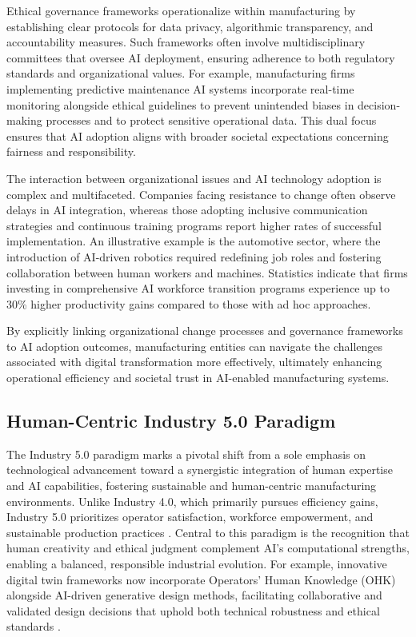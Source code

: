 \documentclass[sigconf]{acmart}
\begin{document}
Ethical governance frameworks operationalize within manufacturing by establishing clear protocols for data privacy, algorithmic transparency, and accountability measures. Such frameworks often involve multidisciplinary committees that oversee AI deployment, ensuring adherence to both regulatory standards and organizational values. For example, manufacturing firms implementing predictive maintenance AI systems incorporate real-time monitoring alongside ethical guidelines to prevent unintended biases in decision-making processes and to protect sensitive operational data. This dual focus ensures that AI adoption aligns with broader societal expectations concerning fairness and responsibility.

The interaction between organizational issues and AI technology adoption is complex and multifaceted. Companies facing resistance to change often observe delays in AI integration, whereas those adopting inclusive communication strategies and continuous training programs report higher rates of successful implementation. An illustrative example is the automotive sector, where the introduction of AI-driven robotics required redefining job roles and fostering collaboration between human workers and machines. Statistics indicate that firms investing in comprehensive AI workforce transition programs experience up to 30\% higher productivity gains compared to those with ad hoc approaches.

By explicitly linking organizational change processes and governance frameworks to AI adoption outcomes, manufacturing entities can navigate the challenges associated with digital transformation more effectively, ultimately enhancing operational efficiency and societal trust in AI-enabled manufacturing systems.

\subsection{Human-Centric Industry 5.0 Paradigm}

The Industry 5.0 paradigm marks a pivotal shift from a sole emphasis on technological advancement toward a synergistic integration of human expertise and AI capabilities, fostering sustainable and human-centric manufacturing environments. Unlike Industry 4.0, which primarily pursues efficiency gains, Industry 5.0 prioritizes operator satisfaction, workforce empowerment, and sustainable production practices \cite{ref2}. Central to this paradigm is the recognition that human creativity and ethical judgment complement AI’s computational strengths, enabling a balanced, responsible industrial evolution. For example, innovative digital twin frameworks now incorporate Operators’ Human Knowledge (OHK) alongside AI-driven generative design methods, facilitating collaborative and validated design decisions that uphold both technical robustness and ethical standards \cite{ref14}.
\end{document}
